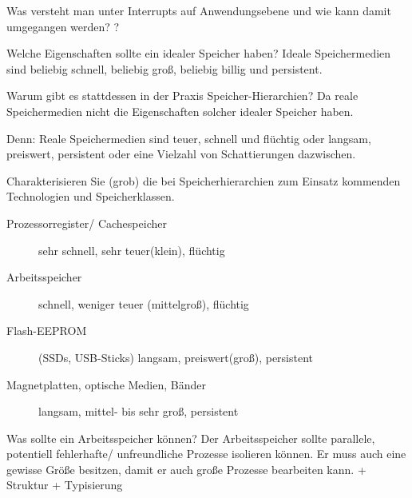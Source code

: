 \documentclass[avery5371]{flashcards}
\begin{document}
\begin{flashcard}{Was versteht man unter Interrupts auf Anwendungsebene und wie kann damit umgegangen werden?}
    ?
\end{flashcard}

\begin{flashcard}[Speichermanagement]{Welche Eigenschaften sollte ein idealer Speicher haben?}
    Ideale Speichermedien sind beliebig schnell, beliebig groß, beliebig billig und persistent.
\end{flashcard}

\begin{flashcard}[Speichermanagement]{Warum gibt es stattdessen in der Praxis Speicher-Hierarchien?}
    Da reale Speichermedien nicht die Eigenschaften solcher idealer Speicher haben.

    Denn: Reale Speichermedien sind teuer, schnell und flüchtig oder langsam, preiswert, persistent oder eine Vielzahl von Schattierungen dazwischen.
\end{flashcard}

\begin{flashcard}[Speichermanagement]{Charakterisieren Sie (grob) die bei Speicherhierarchien zum Einsatz kommenden Technologien und Speicherklassen.}
    \begin{description}
        \item[Prozessorregister/ Cachespeicher] sehr schnell, sehr teuer(klein), flüchtig
        \item[Arbeitsspeicher] schnell, weniger teuer (mittelgroß), flüchtig
        \item[Flash-EEPROM] (SSDs, USB-Sticks) langsam, preiswert(groß), persistent
        \item[Magnetplatten, optische Medien, Bänder] langsam, mittel- bis sehr groß, persistent
    \end{description}
\end{flashcard}

\begin{flashcard}[Speichermanagement]{Was sollte ein Arbeitsspeicher können?}
    Der Arbeitsspeicher sollte parallele, potentiell fehlerhafte/ unfreundliche Prozesse isolieren können. Er muss auch eine gewisse Größe besitzen, damit er auch große Prozesse bearbeiten kann. + Struktur + Typisierung
\end{flashcard}
\end{document}
